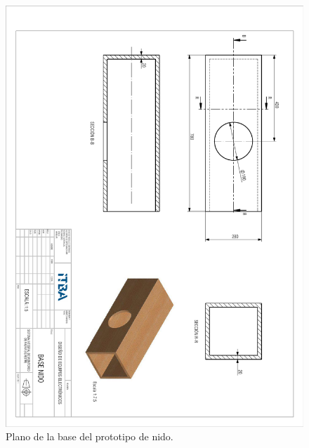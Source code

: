 \begin{figure}[H]
	\centering
	\includegraphics[width=\linewidth]{ImagenesApendice/Base_nido_plano}
	\caption{Plano de la base del prototipo de nido.}
	\label{fig:base_nido_plano}
\end{figure}


